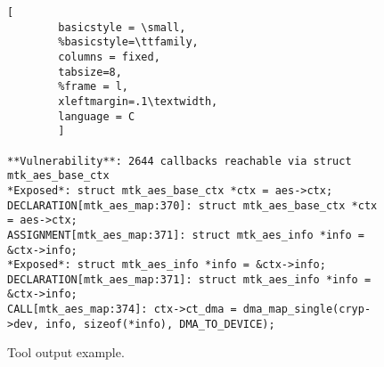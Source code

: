 
\begin{figure*}[t]

        \begin{lstlisting}[
        basicstyle = \small,
        %basicstyle=\ttfamily,
        columns = fixed,
        tabsize=8,
        %frame = l,
        xleftmargin=.1\textwidth,
        language = C
        ]

**Vulnerability**: 2644 callbacks reachable via struct mtk_aes_base_ctx
*Exposed*: struct mtk_aes_base_ctx *ctx = aes->ctx;
DECLARATION[mtk_aes_map:370]: struct mtk_aes_base_ctx *ctx = aes->ctx;
ASSIGNMENT[mtk_aes_map:371]: struct mtk_aes_info *info = &ctx->info;
*Exposed*: struct mtk_aes_info *info = &ctx->info;
DECLARATION[mtk_aes_map:371]: struct mtk_aes_info *info = &ctx->info;
CALL[mtk_aes_map:374]: ctx->ct_dma = dma_map_single(cryp->dev, info, sizeof(*info), DMA_TO_DEVICE);
                \end{lstlisting}
        \caption{ Tool output example.}
        \label{fig:tool_example}

\end{figure*}